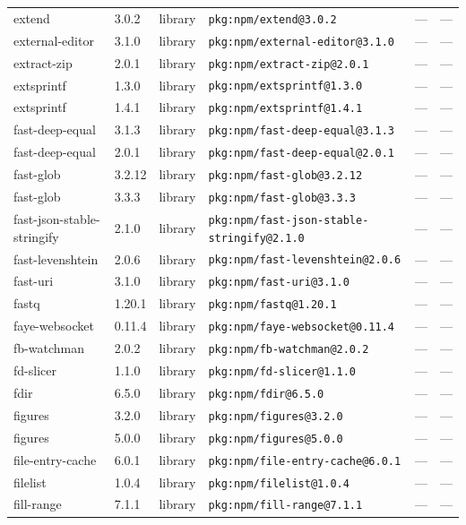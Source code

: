 \documentclass[11pt]{article}
\begin{document}
\begin{longtable}{|l|l|l|p{2.2cm}|l|p{4cm}|}
extend & 3.0.2 & library & \texttt{pkg:npm/extend@3.0.2} & — & — \\
external-editor & 3.1.0 & library & \texttt{pkg:npm/external-editor@3.1.0} & — & — \\
extract-zip & 2.0.1 & library & \texttt{pkg:npm/extract-zip@2.0.1} & — & — \\
extsprintf & 1.3.0 & library & \texttt{pkg:npm/extsprintf@1.3.0} & — & — \\
extsprintf & 1.4.1 & library & \texttt{pkg:npm/extsprintf@1.4.1} & — & — \\
fast-deep-equal & 3.1.3 & library & \texttt{pkg:npm/fast-deep-equal@3.1.3} & — & — \\
fast-deep-equal & 2.0.1 & library & \texttt{pkg:npm/fast-deep-equal@2.0.1} & — & — \\
fast-glob & 3.2.12 & library & \texttt{pkg:npm/fast-glob@3.2.12} & — & — \\
fast-glob & 3.3.3 & library & \texttt{pkg:npm/fast-glob@3.3.3} & — & — \\
fast-json-stable-stringify & 2.1.0 & library & \texttt{pkg:npm/fast-json-stable-stringify@2.1.0} & — & — \\
fast-levenshtein & 2.0.6 & library & \texttt{pkg:npm/fast-levenshtein@2.0.6} & — & — \\
fast-uri & 3.1.0 & library & \texttt{pkg:npm/fast-uri@3.1.0} & — & — \\
fastq & 1.20.1 & library & \texttt{pkg:npm/fastq@1.20.1} & — & — \\
faye-websocket & 0.11.4 & library & \texttt{pkg:npm/faye-websocket@0.11.4} & — & — \\
fb-watchman & 2.0.2 & library & \texttt{pkg:npm/fb-watchman@2.0.2} & — & — \\
fd-slicer & 1.1.0 & library & \texttt{pkg:npm/fd-slicer@1.1.0} & — & — \\
fdir & 6.5.0 & library & \texttt{pkg:npm/fdir@6.5.0} & — & — \\
figures & 3.2.0 & library & \texttt{pkg:npm/figures@3.2.0} & — & — \\
figures & 5.0.0 & library & \texttt{pkg:npm/figures@5.0.0} & — & — \\
file-entry-cache & 6.0.1 & library & \texttt{pkg:npm/file-entry-cache@6.0.1} & — & — \\
filelist & 1.0.4 & library & \texttt{pkg:npm/filelist@1.0.4} & — & — \\
fill-range & 7.1.1 & library & \texttt{pkg:npm/fill-range@7.1.1} & — & — \\

\end{longtable}
\end{document}
